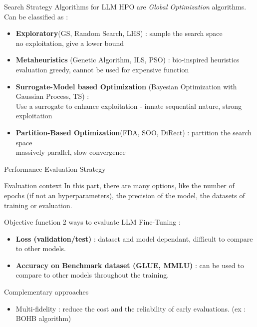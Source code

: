 \begin{frame}{Search Strategy}
    Algorithms for LLM HPO are \textit{Global Optimization} algorithms. Can be classified as : 

    \begin{itemize}
        \item \textbf{Exploratory}(GS, Random Search, LHS) : sample the search space\\ \quad no exploitation, give a lower bound
        \item \textbf{Metaheuristics} (Genetic Algorithm, ILS, PSO) : bio-inspired heuristics \\ \quad evaluation greedy, cannot be used for expensive function
        \item \textbf{Surrogate-Model based Optimization} (Bayesian Optimization with Gaussian Process, TS) : \\ \quad Use a surrogate to enhance exploitation - innate sequential nature, strong exploitation
        \item \textbf{Partition-Based Optimization}(FDA, SOO, DiRect) : partition the search space \\ \quad massively parallel, slow convergence
    \end{itemize}


\end{frame}


\begin{frame}{Performance Evaluation Strategy}
    \begin{block}{Evaluation context}
    In this part, there are many options, like the number of epochs (if not an hyperparameters), the precision of the model, the datasets of training or evaluation. 
        
    \end{block}
    \begin{block}{Objective function}
        2 ways to evaluate LLM Fine-Tuning : 
        \begin{itemize}
            \item \textbf{Loss (validation/test)} : dataset and model dependant, difficult to compare to other models.
            \item \textbf{Accuracy on Benchmark dataset (GLUE, MMLU)} : can be used to compare to other models throughout the training. 
        \end{itemize}
    \end{block}

    \begin{block}{Complementary approaches}
        \begin{itemize}
            \item Multi-fidelity : reduce the cost and the reliability of early evaluations. (ex : BOHB algorithm)
        \end{itemize}
        
    \end{block}
    
\end{frame}